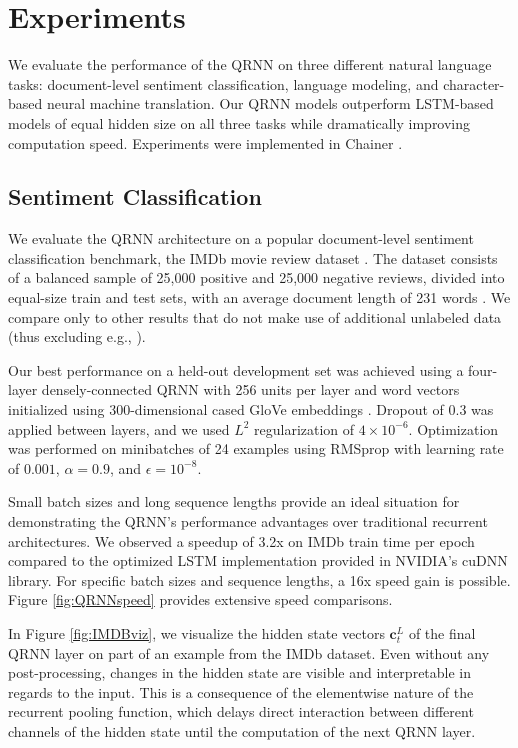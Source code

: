 \documentclass{article} \usepackage{iclr2017_conference,times}
\begin{document}
\section{Experiments}
We evaluate the performance of the QRNN on three different natural language tasks: document-level sentiment classification, language modeling, and character-based neural machine translation. Our QRNN models outperform LSTM-based models of equal hidden size on all three tasks while dramatically improving computation speed. Experiments were implemented in Chainer \citep{Tokui2015}.

\subsection{Sentiment Classification}

We evaluate the QRNN architecture on a popular document-level sentiment classification benchmark, the IMDb movie review dataset \citep{Maas2011}. The dataset consists of a balanced sample of 25,000 positive and 25,000 negative reviews, divided into equal-size train and test sets, with an average document length of 231 words \citep{Wang2012}. We compare only to other results that do not make use of additional unlabeled data (thus excluding e.g., \citet{Miyato2016}).

Our best performance on a held-out development set was achieved using a four-layer densely-connected QRNN with 256 units per layer and word vectors initialized using 300-dimensional cased GloVe embeddings \citep{Pennington2014}. Dropout of 0.3 was applied between layers, and we used $L^2$ regularization of $4\times 10^{-6}$.
Optimization was performed on minibatches of 24 examples using RMSprop \citep{Tieleman2012} with learning rate of $0.001$, $\alpha=0.9$, and $\epsilon=10^{-8}$.

Small batch sizes and long sequence lengths provide an ideal situation for demonstrating the QRNN's performance advantages over traditional recurrent architectures.
We observed a speedup of 3.2x on IMDb train time per epoch compared to the optimized LSTM implementation provided in NVIDIA's cuDNN library.
For specific batch sizes and sequence lengths, a 16x speed gain is possible.
Figure \ref{fig:QRNNspeed} provides extensive speed comparisons.

In Figure \ref{fig:IMDBviz}, we visualize the hidden state vectors $\mathbf{c}^L_t$ of the final QRNN layer on part of an example from the IMDb dataset.
Even without any post-processing, changes in the hidden state are visible and interpretable in regards to the input. This is a consequence of the elementwise nature of the recurrent pooling function, which delays direct interaction between different channels of the hidden state until the computation of the next QRNN layer.
\end{document}

